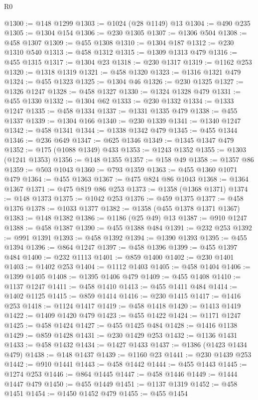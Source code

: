 \begin{lexlean}{R0}
\begin{coremodule}
@1300 := @148 @1299
@1303 := @1024 (@28 @1149) @13
@1304 := @490 @235
@1305 := @1304 @154
@1306 := @230 @1305
@1307 := @1306 @504
@1308 := @458 @1307
@1309 := @455 @1308
@1310 := @1304 @187
@1312 := @230 @1310 @540
@1313 := @458 @1312
@1315 := @1309 @1313 @479
@1316 := @455 @1315
@1317 := @1304 @23
@1318 := @230 @1317
@1319 := @1162 @253
@1320 := @1318 @1319
@1321 := @458 @1320
@1323 := @1316 @1321 @479
@1324 := @455 @1323
@1325 := @1304 @46
@1326 := @230 @1325
@1327 := @1326 @1247
@1328 := @458 @1327
@1330 := @1324 @1328 @479
@1331 := @455 @1330
@1332 := @1304 @62
@1333 := @230 @1332
@1334 := @1333 @1247
@1335 := @458 @1334
@1337 := @1331 @1335 @479
@1338 := @455 @1337
@1339 := @1304 @166
@1340 := @230 @1339
@1341 := @1340 @1247
@1342 := @458 @1341
@1344 := @1338 @1342 @479
@1345 := @455 @1344
@1346 := @236 @649
@1347 := @625 @1346
@1349 := @1345 @1347 @479
@1352 := @175 (@1088 @1349) @433
@1353 := @1243 @1352
@1355 := @1303 (@1241 @1353)
@1356 := @148 @1355
@1357 := @158 @49
@1358 := @1357 @86
@1359 := @503 @1043
@1360 := @793 @1359
@1363 := @455 @1360 @1071 @479
@1364 := @455 @1363
@1367 := @475 @824 @86 @1043
@1368 := @1364 @1367
@1371 := @475 @819 @86 @253
@1373 := @1358 (@1368 @1371)
@1374 := @148 @1373
@1375 := @1042 @253
@1376 := @459 @1375
@1377 := @458 @1376
@1378 := @1033 @1377
@1382 := @1358 (@455 @1378 @1371 @1367)
@1383 := @148 @1382
@1386 := @1186 (@25 @49) @13
@1387 := @910 @1247
@1388 := @458 @1387
@1390 := @455 @1388 @484
@1391 := @232 @253
@1392 := @991 @1391
@1393 := @458 @1392
@1394 := @1390 @1393
@1395 := @455 @1394
@1396 := @864 @1247
@1397 := @458 @1396
@1399 := @455 @1397 @484
@1400 := @232 @1113
@1401 := @859 @1400
@1402 := @230 @1401
@1403 := @1402 @253
@1404 := @1112 @1403
@1405 := @458 @1404
@1406 := @1399 @1405
@1408 := @1395 @1406 @479
@1409 := @455 @1408
@1410 := @1137 @1247
@1411 := @458 @1410
@1413 := @455 @1411 @484
@1414 := @1402 @1125
@1415 := @859 @1414
@1416 := @230 @1415
@1417 := @1416 @253
@1418 := @1124 @1417
@1419 := @458 @1418
@1420 := @1413 @1419
@1422 := @1409 @1420 @479
@1423 := @455 @1422
@1424 := @1171 @1247
@1425 := @458 @1424
@1427 := @455 @1425 @484
@1428 := @1416 @1138
@1429 := @859 @1428
@1431 := @230 @1429 @253
@1432 := @1136 @1431
@1433 := @458 @1432
@1434 := @1427 @1433
@1437 := @1386 (@1423 @1434 @479)
@1438 := @148 @1437
@1439 := @1160 @23
@1441 := @230 @1439 @253
@1442 := @910 @1441
@1443 := @458 @1442
@1444 := @455 @1443
@1445 := @1274 @253
@1446 := @864 @1445
@1447 := @458 @1446
@1449 := @1444 @1447 @479
@1450 := @455 @1449
@1451 := @1137 @1319
@1452 := @458 @1451
@1454 := @1450 @1452 @479
@1455 := @455 @1454

\end{coremodule}
\end{lexlean}
